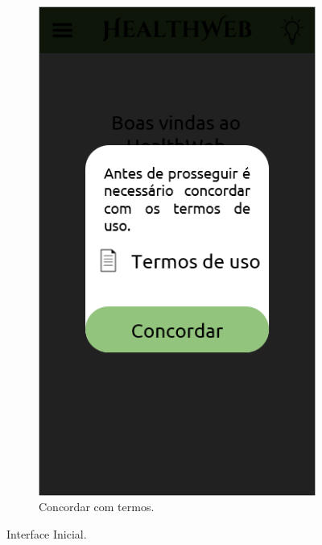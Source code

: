 \begin{figure}[htbp]
\begin{subfigure}{0.24\linewidth}
		\includegraphics[width=\linewidth]{figure/prototype/mobile/agreeing.png}
		\caption{Concordar com termos.}
		\label{fig:mobile:agreeing}
	\end{subfigure}
\hfill
\hspace{0.24\linewidth}
	\caption{Interface Inicial.}
	\label{fig:mobile:home_agreeing}
\end{figure}

